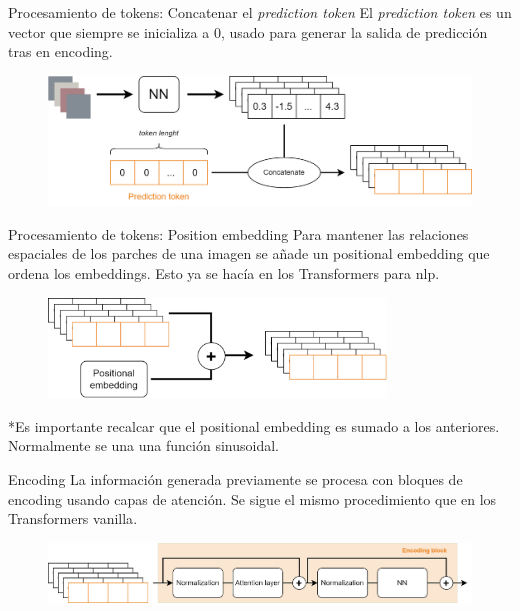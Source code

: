 \begin{frame}{Procesamiento de tokens: Concatenar el \textit{prediction token}}
El \alert{\textit{prediction token}} es un vector que siempre se inicializa a \alert{0}, usado para generar la salida de \alert{predicción tras en encoding}.

\begin{figure}
    \centering
    \includegraphics[width=\textwidth]{figures/Vision_Transformers/Pred_Token.png}
\end{figure}
\end{frame}

\begin{frame}{Procesamiento de tokens: Position embedding}
Para mantener las \alert{relaciones espaciales} de los parches de una imagen se añade un \alert{positional embedding} que \alert{ordena} los embeddings. Esto ya se hacía en los \alert{Transformers} para \gls{nlp}.

\begin{figure}
    \centering
    \includegraphics[width=0.8\textwidth]{figures/Vision_Transformers/Pos_Embedding.png}
\end{figure}

*Es importante recalcar que el positional embedding es \alert{sumado} a los anteriores. Normalmente se una una función \alert{sinusoidal}.
\end{frame}

\begin{frame}{Encoding}
La información generada previamente se procesa con \alert{bloques de encoding} usando capas de \alert{atención}. Se sigue el mismo procedimiento que en los \alert{Transformers vanilla}. 

\begin{figure}
    \centering
    \includegraphics[width=\textwidth]{figures/Vision_Transformers/Encoding_Block.png}
\end{figure}
\end{frame}

